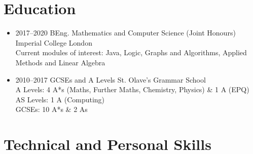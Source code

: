 \documentclass[11pt,a4paper,sans]{moderncv}        %
\begin{document}
\maketitle

\vspace{-30pt}

\section{Education}

\vspace{5pt}

\begin{itemize}

\item{
\cventry
{2017--2020}
{BEng. Mathematics and Computer Science (Joint Honours)}
{Imperial College London}
{}{}{
\noindent
\\
Current modules of interest: Java, Logic, Graphs and Algorithms, Applied Methods and Linear Algebra
}
} %

\item{
\cventry
{2010--2017}
{GCSEs and A Levels}
{St. Olave's Grammar School}
{}{}{
\noindent
\\
A Levels: 4 A*s (Maths, Further Maths, Chemistry, Physics) \& 1 A (EPQ)
\\
AS Levels: 1 A (Computing)
\\
GCSEs: 10 A*s \& 2 As
}}

\end{itemize}

\section{Technical and Personal Skills}
\end{document}
